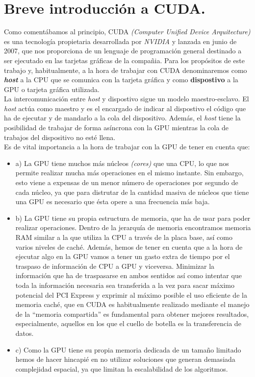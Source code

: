 \section{Breve introducción a CUDA.}
Como comentábamos al principio, CUDA \textit{(Computer Unified Device Arquitecture)} \cite{cuda} es una tecnología propietaria desarrollada por \textit{NVIDIA} y lanzada en junio de 2007, que nos proporciona de un lenguaje de programación general destinado a ser ejecutado en las tarjetas gráficas de la compañia. Para los propósitos de este trabajo y, habitualmente, a la hora de trabajar con CUDA denominaremos como \textbf{\textit{host}} a la CPU que se comunica con la tarjeta gráfica y como \textbf{dispostivo} a la GPU o tarjeta gráfica utilizada. \\

La intercomunicación entre \textit{host} y dispostivo sigue un modelo maestro-esclavo. El \textit{host} actúa como maestro y es el encargado de indicar al dispostivo el código que ha de ejecutar y de mandarlo a la cola del dispositivo. Además, el \textit{host} tiene la posibilidad de trabajar de forma asíncrona con la GPU mientras la cola de trabajos del dispositivo no esté llena. \\

Es de vital importancia a la hora de trabajar con la GPU de tener en cuenta que:\\
\begin{itemize}
    \item a) La GPU tiene muchos más núcleos \textit{(cores)} que una CPU, lo que nos permite realizar mucha más operaciones en el mismo instante. Sin embargo, esto viene a expensas de un menor número de operaciones por segundo de cada núcleo, ya que para distrutar de la cantidad masiva de núcleos que tiene una GPU es necesario que ésta opere a una frecuencia más baja.

    \item b) La GPU tiene su propia estructura de memoria, que ha de usar para poder realizar operaciones. Dentro de la jerarquía de memoria encontramos memoria RAM similar a la que utiliza la CPU a través de la placa base, así como varios niveles de caché. Además, hemos de tener en cuenta que a la hora de ejecutar algo en la GPU vamos a tener un gasto extra de tiempo por el traspaso de información de CPU a GPU y viceversa. Minimizar la información que ha de traspasarse en ambos sentidos así como intentar que toda la información necesaria sea transferida a la vez para sacar máximo potencial del PCI Express y exprimir al máximo posible el uso eficiente de la memoria caché, que en CUDA es habitualmente realizado mediante el manejo de la ``memoria compartida'' es fundamental para obtener mejores resultados, especialmente, aquellos en los que el cuello de botella es la transferencia de datos.

    \item c) Como la GPU tiene su propia memoria dedicada de un tamaño limitado hemos de hacer hincapié en no utilizar soluciones que generan demasiada complejidad espacial, ya que limitan la escalabilidad de los algoritmos.
\end{itemize}

